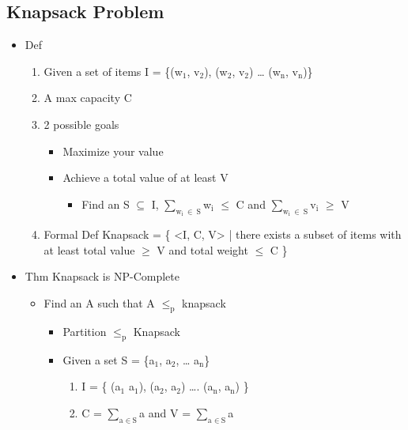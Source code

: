 \documentclass[11pt]{article}
\begin{document}
\subsection{Knapsack Problem}
\label{sec:orgb1c2d1e}
\begin{itemize}
\item Def
\begin{enumerate}
\item Given a set of items I = \{(w\(_{\text{1}}\), v\(_{\text{2}}\)), (w\(_{\text{2}}\), v\(_{\text{2}}\)) \ldots{} (w\(_{\text{n}}\), v\(_{\text{n}}\))\}
\item A max capacity C
\item 2 possible goals
\begin{itemize}
\item Maximize your value
\item Achieve a total value of at least V
\begin{itemize}
\item Find an S \(\subseteq\) I, \(\sum_{\text{w}_{\text{i}} \ \in\ \text{S}}\)w\(_{\text{i}}\) \(\le\) C and \(\sum_{\text{w}_{\text{i}} \ \in\ \text{S}}\)v\(_{\text{i}}\) \(\ge\) V
\end{itemize}
\end{itemize}
\item Formal Def
Knapsack = \{ <I, C, V> | there exists a subset of items with at least total value \(\ge\) V and total weight \(\le\) C \}
\end{enumerate}
\item Thm
Knapsack is NP-Complete
\begin{itemize}
\item Find an A such that A \(\le_{\text{p}}\) knapsack
\begin{itemize}
\item Partition \(\le_{\text{p}}\) Knapsack
\item Given a set S = \{a\(_{\text{1}}\), a\(_{\text{2}}\), \ldots{} a\(_{\text{n}}\)\}
\begin{enumerate}
\item I = \{ (a\(_{\text{1}}\) a\(_{\text{1}}\)), (a\(_{\text{2}}\), a\(_{\text{2}}\)) \ldots{}. (a\(_{\text{n}}\), a\(_{\text{n}}\)) \}
\item C =  \(\sum_{\text{a }\in\ \text{S}}\)a and V =  \(\sum_{\text{a }\in\ \text{S}}\)a
\end{enumerate}
\end{itemize}
\end{itemize}
\end{itemize}
\end{document}
